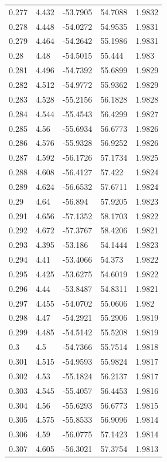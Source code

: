 \begin{tabular}{lllll}
0.277 & 4.432 & -53.7905 & 54.7088 & 1.9832 \\
0.278 & 4.448 & -54.0272 & 54.9535 & 1.9831 \\
0.279 & 4.464 & -54.2642 & 55.1986 & 1.9831 \\
0.28 & 4.48 & -54.5015 & 55.444 & 1.983 \\
0.281 & 4.496 & -54.7392 & 55.6899 & 1.9829 \\
0.282 & 4.512 & -54.9772 & 55.9362 & 1.9829 \\
0.283 & 4.528 & -55.2156 & 56.1828 & 1.9828 \\
0.284 & 4.544 & -55.4543 & 56.4299 & 1.9827 \\
0.285 & 4.56 & -55.6934 & 56.6773 & 1.9826 \\
0.286 & 4.576 & -55.9328 & 56.9252 & 1.9826 \\
0.287 & 4.592 & -56.1726 & 57.1734 & 1.9825 \\
0.288 & 4.608 & -56.4127 & 57.422 & 1.9824 \\
0.289 & 4.624 & -56.6532 & 57.6711 & 1.9824 \\
0.29 & 4.64 & -56.894 & 57.9205 & 1.9823 \\
0.291 & 4.656 & -57.1352 & 58.1703 & 1.9822 \\
0.292 & 4.672 & -57.3767 & 58.4206 & 1.9821 \\
0.293 & 4.395 & -53.186 & 54.1444 & 1.9823 \\
0.294 & 4.41 & -53.4066 & 54.373 & 1.9822 \\
0.295 & 4.425 & -53.6275 & 54.6019 & 1.9822 \\
0.296 & 4.44 & -53.8487 & 54.8311 & 1.9821 \\
0.297 & 4.455 & -54.0702 & 55.0606 & 1.982 \\
0.298 & 4.47 & -54.2921 & 55.2906 & 1.9819 \\
0.299 & 4.485 & -54.5142 & 55.5208 & 1.9819 \\
0.3 & 4.5 & -54.7366 & 55.7514 & 1.9818 \\
0.301 & 4.515 & -54.9593 & 55.9824 & 1.9817 \\
0.302 & 4.53 & -55.1824 & 56.2137 & 1.9817 \\
0.303 & 4.545 & -55.4057 & 56.4453 & 1.9816 \\
0.304 & 4.56 & -55.6293 & 56.6773 & 1.9815 \\
0.305 & 4.575 & -55.8533 & 56.9096 & 1.9814 \\
0.306 & 4.59 & -56.0775 & 57.1423 & 1.9814 \\
0.307 & 4.605 & -56.3021 & 57.3754 & 1.9813 \\

\end{tabular}
